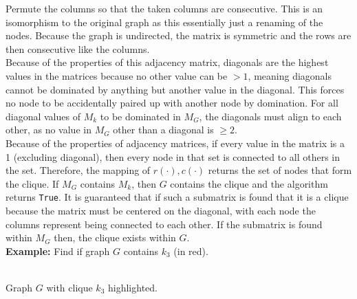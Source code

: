 \documentclass[11pt]{article}
\begin{document}
Permute the columns so that the taken columns are consecutive. This is an isomorphism to the original graph as this essentially just a renaming of the nodes. Because the graph is undirected, the matrix is symmetric and the rows are then consecutive like the columns.\\


Because of the properties of this adjacency matrix, diagonals are the highest values in the matrices because no other value can be $>1$, meaning diagonals cannot be dominated by anything but another value in the diagonal. This forces no node to be accidentally paired up with another node by domination. For all diagonal values of $M_k$ to be dominated in $M_G$, the diagonals must align to each other, as no value in $M_G$ other than a diagonal is $\geq 2$. \\


Because of the properties of adjacency matrices, if every value in the matrix is a 1 (excluding diagonal), then every node in that set is connected to all others in the set. Therefore, the mapping of $r(\cdot),c(\cdot)$ returns the set of nodes that form the clique. If $M_G$ contains $M_k$, then $G$ contains the clique and the algorithm returns \texttt{True}. It is guaranteed that if such a submatrix is found that it is a clique because the matrix must be centered on the diagonal, with each node the columns represent being connected to each other. If the submatrix is found within $M_G$ then, the clique exists within $G$. \lobtomb  \lobwatermark \\
 



\pagebreak
\textbf{Example:} Find if graph $G$ contains $k_3$ (in red).\\
\begin{center}
\\



Graph $G$ with clique $k_3$ highlighted.
\end{center}
\end{document}
